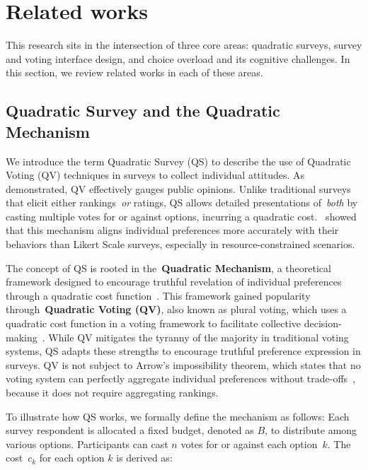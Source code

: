 \section{Related works}
\label{sec:relatedWorks}
This research sits in the intersection of three core areas: quadratic surveys, survey and voting interface design, and choice overload and its cognitive challenges. In this section, we review related works in each of these areas.

\subsection{Quadratic Survey and the Quadratic Mechanism}
We introduce the term Quadratic Survey (QS) to describe the use of Quadratic Voting (QV) techniques in surveys to collect individual attitudes. As~\textcite{quarfoot2017quadratic} demonstrated, QV effectively gauges public opinions. Unlike traditional surveys that elicit either rankings~\textit{or} ratings, QS allows detailed presentations of~\textit{both} by casting multiple votes for or against options, incurring a quadratic cost.~\textcite{chengCanShowWhat2021} showed that this mechanism aligns individual preferences more accurately with their behaviors than Likert Scale surveys, especially in resource-constrained scenarios.

The concept of QS is rooted in the~\textbf{Quadratic Mechanism}, a theoretical framework designed to encourage truthful revelation of individual preferences through a quadratic cost function~\cite{grovesOptimalAllocationPublic1977}. This framework gained popularity through~\textbf{Quadratic Voting (QV)}, also known as plural voting, which uses a quadratic cost function in a voting framework to facilitate collective decision-making~\cite{lalley2016quadratic}. While QV mitigates the tyranny of the majority in traditional voting systems, QS adapts these strengths to encourage truthful preference expression in surveys. QV is not subject to Arrow's impossibility theorem, which states that no voting system can perfectly aggregate individual preferences without trade-offs~\cite{morreau2014arrow}, because it does not require aggregating rankings.

To illustrate how QS works, we formally define the mechanism as follows: Each survey respondent is allocated a fixed budget, denoted as $B$, to distribute among various options. Participants can cast $n$ votes for or against each option~$k$. The cost~$c_k$ for each option $k$ is derived as:

